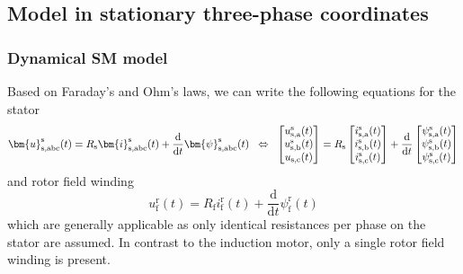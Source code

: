 \subsection{Model in stationary three-phase coordinates}

\begin{frame}
	\frametitle{Dynamical SM model}
    Based on Faraday's and Ohm's laws, we can write the following equations for the stator 
    \begin{equation}
            \bm{u}^\mathrm{s}_\mathrm{s,abc}(t) = R_\mathrm{s}\bm{i}^\mathrm{s}_\mathrm{s,abc}(t)+\frac{\mathrm{d}}{\mathrm{d}t}\bm{\psi}^\mathrm{s}_\mathrm{s,abc}(t) \hspace{0.2cm} \Leftrightarrow \hspace{0.2cm} \begin{bmatrix}
                u_{\mathrm{s,a}}^\mathrm{s}(t)\\
                u_{\mathrm{s,b}}^\mathrm{s}(t)\\
                u_{\mathrm{s,c}}(t)\\
            \end{bmatrix} = R_\mathrm{s} \begin{bmatrix}
                i_{\mathrm{s,a}}^\mathrm{s}(t)\\
                i_{\mathrm{s,b}}^\mathrm{s}(t)\\
                i_{\mathrm{s,c}}^\mathrm{s}(t)\\
            \end{bmatrix} + \frac{\mathrm{d}}{\mathrm{d}t} \begin{bmatrix}
                \psi_{\mathrm{s,a}}^\mathrm{s}(t)\\
                \psi_{\mathrm{s,b}}^\mathrm{s}(t)\\
                \psi_{\mathrm{s,c}}^\mathrm{s}(t)\\
            \end{bmatrix}
            \label{eq:SM_stator_three_phase_voltage_equation}
    \end{equation}
    \pause
    and rotor field winding
    \begin{equation}
            u^\mathrm{r}_\mathrm{f}(t) = R_\mathrm{f}i^\mathrm{r}_\mathrm{f}(t)+\frac{\mathrm{d}}{\mathrm{d}t}\psi^\mathrm{r}_\mathrm{f}(t) 
            \label{eq:SM_rotor_voltage_equation}
    \end{equation}
which are generally applicable as only identical resistances per phase on the stator are assumed. \pause In contrast to the induction motor, only a single rotor field winding is present.
\end{frame}


